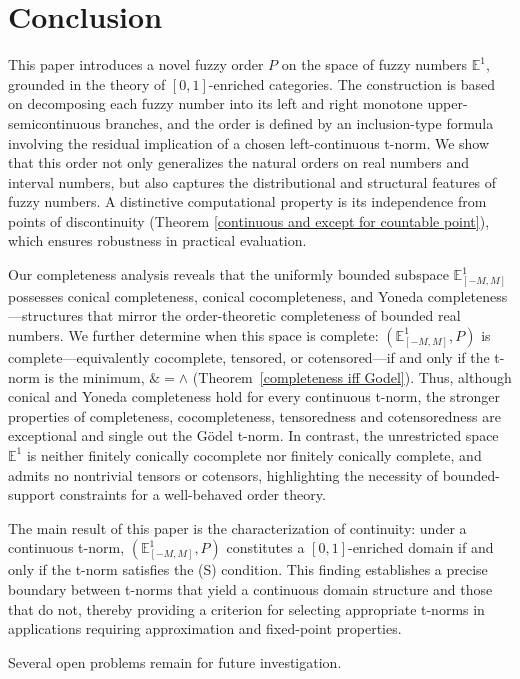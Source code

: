 \documentclass[preprint,3p,times]{elsarticle}
\theoremstyle{plain}
\theoremstyle{definition}
\numberwithin{equation}{section}
\begin{document}
\section{Conclusion}
This paper introduces a novel fuzzy order \(P\) on the space of fuzzy numbers \(\mathbb{E}^1\), grounded in the theory of \([0,1]\)-enriched categories. The construction is based on decomposing each fuzzy number into its left and right monotone upper-semicontinuous branches, and the order is defined by an inclusion-type formula involving the residual implication of a chosen left-continuous t-norm. We show that this order not only generalizes the natural orders on real numbers and interval numbers, but also captures the distributional and structural features of fuzzy numbers. A distinctive computational property is its independence from points of discontinuity (Theorem \ref{continuous and except for countable point}), which ensures robustness in practical evaluation.

Our completeness analysis reveals that the uniformly bounded subspace \(\mathbb{E}^1_{[-M,M]}\) possesses conical completeness, conical cocompleteness, and Yoneda completeness---structures that mirror the order-theoretic completeness of bounded real numbers. We further determine when this space is complete: \((\mathbb{E}^1_{[-M,M]},P)\) is complete---equivalently cocomplete, tensored, or cotensored---if and only if the t-norm is the minimum, \(\&=\wedge\) (Theorem~\ref{completeness iff Godel}). Thus, although conical and Yoneda completeness hold for every continuous t-norm, the stronger properties of completeness, cocompleteness, tensoredness and cotensoredness are exceptional and single out the Gödel t-norm. In contrast, the unrestricted space \(\mathbb{E}^1\) is neither finitely conically cocomplete nor finitely conically complete, and admits no nontrivial tensors or cotensors, highlighting the necessity of bounded-support constraints for a well-behaved order theory.



The main result of this paper is the characterization of continuity: under a continuous t-norm, \((\mathbb{E}^1_{[-M,M]}, P)\) constitutes a \([0,1]\)-enriched domain if and only if the t-norm satisfies the (S) condition. This finding establishes a precise boundary between t-norms that yield a continuous domain structure and those that do not, thereby providing a criterion for selecting appropriate t-norms in applications requiring approximation and fixed-point properties.

Several open problems remain for future investigation.
\end{document}
